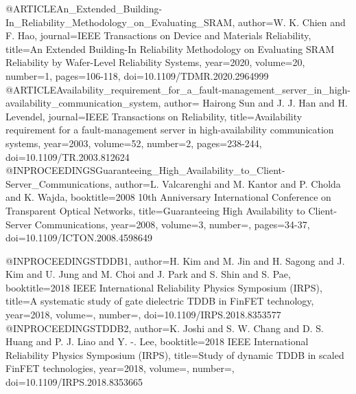 @ARTICLE{An_Extended_Building-In_Reliability_Methodology_on_Evaluating_SRAM,
	author={W. K. {Chien} and F. {Hao}},
	journal={IEEE Transactions on Device and Materials Reliability}, 
	title={An Extended Building-In Reliability Methodology on Evaluating SRAM Reliability by Wafer-Level Reliability Systems}, 
	year={2020},
	volume={20},
	number={1},
	pages={106-118},	
	doi={10.1109/TDMR.2020.2964999}
}
@ARTICLE{Availability_requirement_for_a_fault-management_server_in_high-availability_communication_system,
	author={ {Hairong Sun} and J. J. {Han} and H. {Levendel}},
	journal={IEEE Transactions on Reliability}, 
	title={Availability requirement for a fault-management server in high-availability communication systems}, 
	year={2003},
	volume={52},	
	number={2},
	pages={238-244},	
	doi={10.1109/TR.2003.812624}
}
@INPROCEEDINGS{Guaranteeing_High_Availability_to_Client-Server_Communications,
	author={L. {Valcarenghi} and M. {Kantor} and P. {Cholda} and K. {Wajda}},
	booktitle={2008 10th Anniversary International Conference on Transparent Optical Networks}, 
	title={Guaranteeing High Availability to Client-Server Communications}, 
	year={2008},
	volume={3},
	number={},
	pages={34-37},	
	doi={10.1109/ICTON.2008.4598649}
}

@INPROCEEDINGS{TDDB1,
	author={H. {Kim} and M. {Jin} and H. {Sagong} and J. {Kim} and U. {Jung} and M. {Choi} and J. {Park} and S. {Shin} and S. {Pae}},
	booktitle={2018 IEEE International Reliability Physics Symposium (IRPS)}, 
	title={A systematic study of gate dielectric TDDB in FinFET technology}, 
	year={2018},
	volume={},
	number={},
	doi={10.1109/IRPS.2018.8353577}
}
@INPROCEEDINGS{TDDB2,
	author={K. {Joshi} and S. W. {Chang} and D. S. {Huang} and P. J. {Liao} and Y. -. {Lee}},
	booktitle={2018 IEEE International Reliability Physics Symposium (IRPS)}, 
	title={Study of dynamic TDDB in scaled FinFET technologies}, 
	year={2018},
	volume={},
	number={},
	doi={10.1109/IRPS.2018.8353665}
}

